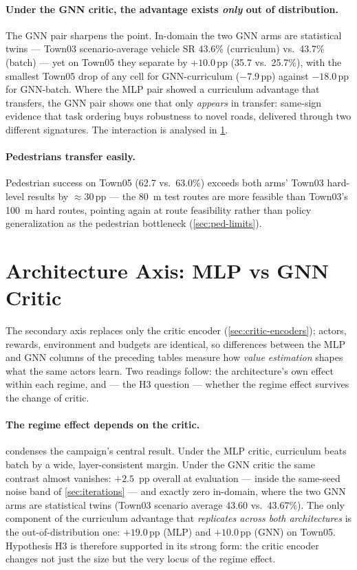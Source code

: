 \paragraph{Under the GNN critic, the advantage exists \emph{only} out of
distribution.}
The GNN pair sharpens the point. In-domain the two GNN arms are
statistical twins --- Town03 scenario-average vehicle SR 43.6\%
(curriculum) vs.\ 43.7\% (batch) --- yet on Town05 they separate by
$+10.0$\,pp (35.7 vs.\ 25.7\%), with the smallest Town05 drop of any
cell for GNN-curriculum ($-7.9$\,pp) against $-18.0$\,pp for GNN-batch.
Where the MLP pair showed a curriculum advantage that transfers, the GNN
pair shows one that only \emph{appears} in transfer: same-sign evidence
that task ordering buys robustness to novel roads, delivered through two
different signatures. The interaction is analysed in
\cref{sec:arch-axis}.

\paragraph{Pedestrians transfer easily.}
Pedestrian success on Town05 (62.7 vs.\ 63.0\%) exceeds both arms'
Town03 hard-level results by $\approx 30$\,pp --- the \SI{80}{m} test
routes are more feasible than Town03's \SI{100}{m} hard routes, pointing
again at route feasibility rather than policy generalization as the
pedestrian bottleneck (\cref{sec:ped-limits}).

\section{Architecture Axis: MLP vs GNN Critic}
\label{sec:arch-axis}

The secondary axis replaces only the critic encoder
(\cref{sec:critic-encoders}); actors, rewards, environment and budgets
are identical, so differences between the MLP and GNN columns of the
preceding tables measure how \emph{value estimation} shapes what the
same actors learn. Two readings follow: the architecture's own effect
within each regime, and --- the H3 question --- whether the regime effect
survives the change of critic.

\paragraph{The regime effect depends on the critic.}
 condenses the campaign's central result. Under
the MLP critic, curriculum beats batch by a wide, layer-consistent
margin. Under the GNN critic the same contrast almost vanishes: $+2.5$
\,pp overall at evaluation --- inside the same-seed noise band of
\cref{sec:iterations} --- and exactly zero in-domain, where the two GNN
arms are statistical twins (Town03 scenario average 43.60 vs.\
43.67\%). The only component of the curriculum advantage that
\emph{replicates across both architectures} is the out-of-distribution
one: $+19.0$\,pp (MLP) and $+10.0$\,pp (GNN) on Town05. Hypothesis H3
is therefore supported in its strong form: the critic encoder changes
not just the size but the very locus of the regime effect.

